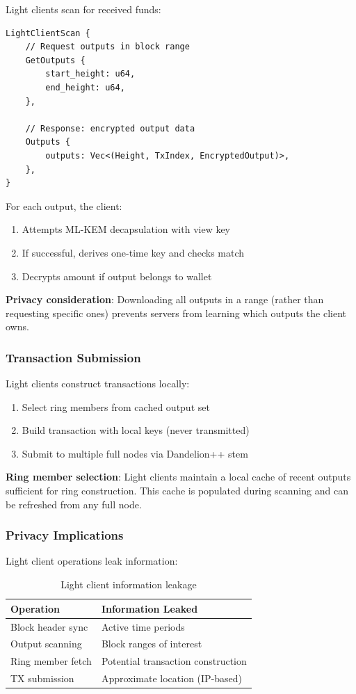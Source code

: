 Light clients scan for received funds:

\begin{lstlisting}[caption={Light client scanning protocol}]
LightClientScan {
    // Request outputs in block range
    GetOutputs {
        start_height: u64,
        end_height: u64,
    },

    // Response: encrypted output data
    Outputs {
        outputs: Vec<(Height, TxIndex, EncryptedOutput)>,
    },
}
\end{lstlisting}

For each output, the client:
\begin{enumerate}
  \item Attempts ML-KEM decapsulation with view key
  \item If successful, derives one-time key and checks match
  \item Decrypts amount if output belongs to wallet
\end{enumerate}

\textbf{Privacy consideration}: Downloading all outputs in a range (rather
than requesting specific ones) prevents servers from learning which outputs
the client owns.

\subsubsection{Transaction Submission}

Light clients construct transactions locally:
\begin{enumerate}
  \item Select ring members from cached output set
  \item Build transaction with local keys (never transmitted)
  \item Submit to multiple full nodes via Dandelion++ stem
\end{enumerate}

\textbf{Ring member selection}: Light clients maintain a local cache of
recent outputs sufficient for ring construction. This cache is populated
during scanning and can be refreshed from any full node.

\subsubsection{Privacy Implications}

Light client operations leak information:

\begin{table}[h]
\centering
\caption{Light client information leakage}
\label{tab:light-privacy}
\begin{tabular}{@{}ll@{}}
\toprule
\textbf{Operation} & \textbf{Information Leaked} \\
\midrule
Block header sync & Active time periods \\
Output scanning & Block ranges of interest \\
Ring member fetch & Potential transaction construction \\
TX submission & Approximate location (IP-based) \\
\bottomrule
\end{tabular}
\end{table}

